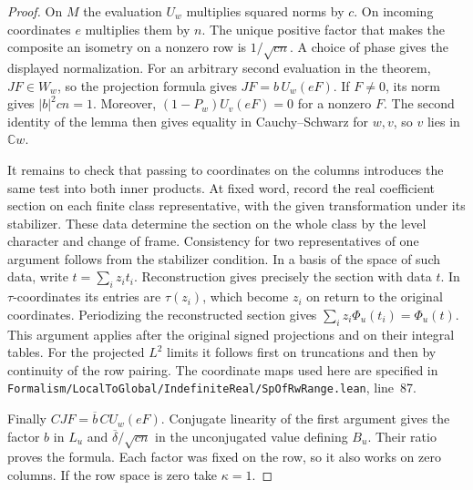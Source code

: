 \documentclass[a4paper,11pt]{article}
\theoremstyle{definition}
\theoremstyle{remark}
\newcommand{\srcloc}[2]{{\small\nolinkurl{#1.lean}}, line~#2}
\numberwithin{equation}{section}
\begin{document}
\begin{proof}
On \(M\) the evaluation \(U_w\) multiplies squared norms by \(c\).
On incoming coordinates \(e\) multiplies them by \(n\). The unique
positive factor that makes the composite an isometry on a nonzero
row is \(1/\sqrt{cn}\). A choice of phase gives the displayed
normalization. For an arbitrary second evaluation in the theorem,
\(JF\in W_w\), so the projection formula gives
\(JF=b\,U_w(eF)\). If \(F\ne0\), its norm gives
\(|b|^2cn=1\). Moreover, \((1-P_w)U_v(eF)=0\) for a nonzero \(F\).
The second identity of the lemma then gives equality in
Cauchy--Schwarz for \(w,v\), so \(v\) lies in \(\mathbb C w\).

It remains to check that passing to coordinates on the columns
introduces the same test into both inner products. At fixed word,
record the real coefficient section on each finite class
representative, with the given transformation under its stabilizer.
These data determine the section on the whole class by the level
character and change of frame. Consistency for two representatives
of one argument follows from the stabilizer condition. In a basis
of the space of such data, write \(t=\sum_i z_i t_i\).
Reconstruction gives precisely the section with data \(t\).
In \(\tau\)-coordinates its entries are \(\tau(z_i)\), which become
\(z_i\) on return to the original coordinates. Periodizing the
reconstructed section gives \(\sum_i z_i\Phi_u(t_i)=\Phi_u(t)\).
This argument applies after the original signed projections and on
their integral tables. For the projected \(L^2\) limits it follows
first on truncations and then by continuity of the row pairing.
The coordinate maps used here are specified in
\srcloc{Formalism/LocalToGlobal/IndefiniteReal/SpOfRwRange}{87}.

Finally \(CJF=\overline b\,C U_w(eF)\).
Conjugate linearity of the first argument gives the factor \(b\)
in \(L_u\) and \(\overline\delta/\sqrt{cn}\) in the unconjugated
value defining \(B_u\). Their ratio proves the formula. Each factor
was fixed on the row, so it also works on zero columns. If the row
space is zero take \(\kappa=1\).
\end{proof}
\end{document}

